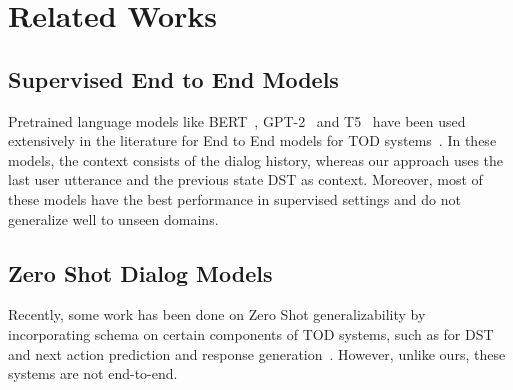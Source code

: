 \section{Related Works}

\subsection{Supervised End to End Models}
Pretrained language models like BERT~\cite{Devlin2019BERTPO}, GPT-2~\cite{Radford2019LanguageMA} and T5~\cite{Raffel2019ExploringTL}
have been used extensively in the literature for End to End models for TOD systems~\cite{HosseiniAsl2020ASL,Peng2021SoloistBT,Lee2020SUMBTLaRLEN,Yang2020UBARTF,Jeon2021DORATP,Sun2022BORTBA,Yang2022UBARv2TM,Noroozi2020AFA}.
In these models, the context consists of the dialog history, whereas our approach uses the last user utterance and the previous state DST as context.
Moreover, most of these models have the best performance in supervised settings and do not generalize well to unseen domains.

\subsection{Zero Shot Dialog Models}

Recently, some work has been done on Zero Shot generalizability by incorporating schema on certain components of TOD systems,
such as for DST~\cite{Feng2020ASA,Lee2021DialogueST,Noroozi2020AFA}
and next action prediction and response generation~\cite{Mosig2020STARAS,Mehri2021SchemaGuidedPF}. 
However, unlike ours, these systems are not end-to-end.